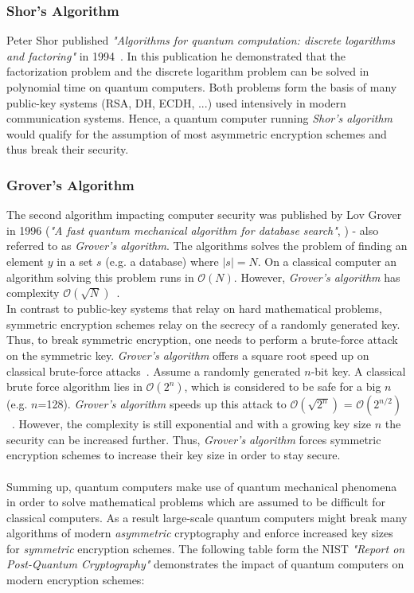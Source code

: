 \subsubsection{Shor's Algorithm}
Peter Shor published \textit{"Algorithms for quantum computation: discrete logarithms and factoring"} in 1994~\parencite{shor1994algorithms}. In this publication he demonstrated that the factorization problem and the discrete logarithm problem can be solved in polynomial time on quantum computers. Both problems form the basis of many public-key systems (\gls{RSA}, \gls{DH}, \gls{ECDH}, ...) used intensively in modern communication systems. Hence, a quantum computer running \textit{Shor's algorithm} would qualify for the assumption of most asymmetric encryption schemes and thus break their security.


\subsubsection{Grover's Algorithm}
The second algorithm impacting computer security was published by Lov Grover in 1996 (\textit{"A fast quantum mechanical algorithm for database search"}, \parencite{grover1996fast}) - also referred to as \textit{Grover's algorithm}. The algorithms solves the problem of finding an element $y$ in a set $s$ (e.g. a database) where $|s| = N$. On a classical computer an algorithm solving this problem runs in $\mathcal{O}(N)$. However, \textit{Grover's algorithm} has complexity $\mathcal{O}(\sqrt{N})$~\parencite{nielsen2002quantum}.\\
In contrast to public-key systems that relay on hard mathematical problems, symmetric encryption schemes relay on the secrecy of a randomly generated key. 
Thus, to break symmetric encryption, one needs to perform a brute-force attack on the symmetric key. \textit{Grover's algorithm} offers a square root speed up on classical brute-force attacks~\parencite{mavroeidis2018impact}. Assume a randomly generated $n$-bit key. A classical brute force algorithm lies in $\mathcal{O}(2^n)$, which is considered to be safe for a big $n$ (e.g. $n$=128). \textit{Grover's algorithm} speeds up this attack to $\mathcal{O}(\sqrt{2^n})$ = $\mathcal{O}(2^{n/2})$~\parencite{mavroeidis2018impact}. However, the complexity is still exponential and with a growing key size $n$ the security can be increased further. Thus, \textit{Grover's algorithm} forces symmetric encryption schemes to increase their key size in order to stay secure.
\\\\
Summing up, quantum computers make use of quantum mechanical phenomena in order to solve mathematical problems which are assumed to be difficult for classical computers. As a result large-scale quantum computers might break many algorithms of modern \textit{asymmetric} cryptography and enforce increased key sizes for \textit{symmetric} encryption schemes. The following table form the \gls{NIST} \textit{"Report on Post-Quantum Cryptography"} \parencite{chen2016report} demonstrates the impact of quantum computers on modern encryption schemes:

